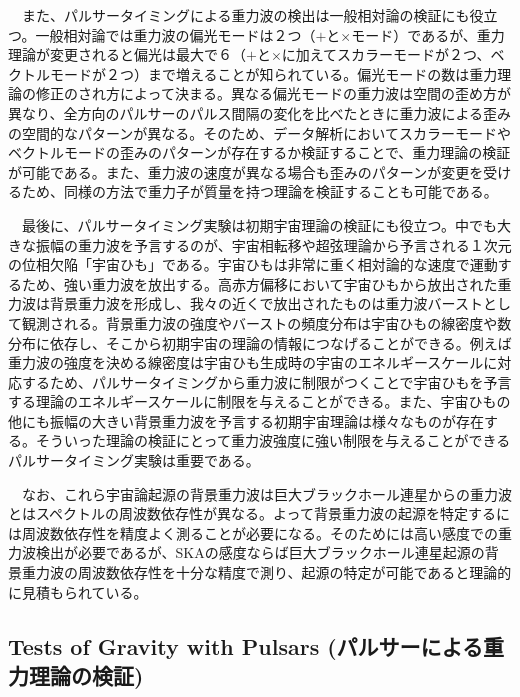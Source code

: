 　また、パルサータイミングによる重力波の検出は一般相対論の検証にも役立つ。一般相対論では重力波の偏光モードは２つ（$+$と$\times$モード）であるが、重力理論が変更されると偏光は最大で６（$+$と$\times$に加えてスカラーモードが２つ、ベクトルモードが２つ）まで増えることが知られている。偏光モードの数は重力理論の修正のされ方によって決まる。異なる偏光モードの重力波は空間の歪め方が異なり、全方向のパルサーのパルス間隔の変化を比べたときに重力波による歪みの空間的なパターンが異なる。そのため、データ解析においてスカラーモードやベクトルモードの歪みのパターンが存在するか検証することで、重力理論の検証が可能である。また、重力波の速度が異なる場合も歪みのパターンが変更を受けるため、同様の方法で重力子が質量を持つ理論を検証することも可能である。

　最後に、パルサータイミング実験は初期宇宙理論の検証にも役立つ。中でも大きな振幅の重力波を予言するのが、宇宙相転移や超弦理論から予言される１次元の位相欠陥「宇宙ひも」である。宇宙ひもは非常に重く相対論的な速度で運動するため、強い重力波を放出する。高赤方偏移において宇宙ひもから放出された重力波は背景重力波を形成し、我々の近くで放出されたものは重力波バーストとして観測される。背景重力波の強度やバーストの頻度分布は宇宙ひもの線密度や数分布に依存し、そこから初期宇宙の理論の情報につなげることができる。例えば重力波の強度を決める線密度は宇宙ひも生成時の宇宙のエネルギースケールに対応するため、パルサータイミングから重力波に制限がつくことで宇宙ひもを予言する理論のエネルギースケールに制限を与えることができる。また、宇宙ひもの他にも振幅の大きい背景重力波を予言する初期宇宙理論は様々なものが存在する。そういった理論の検証にとって重力波強度に強い制限を与えることができるパルサータイミング実験は重要である。

　なお、これら宇宙論起源の背景重力波は巨大ブラックホール連星からの重力波とはスペクトルの周波数依存性が異なる。よって背景重力波の起源を特定するには周波数依存性を精度よく測ることが必要になる。そのためには高い感度での重力波検出が必要であるが、SKAの感度ならば巨大ブラックホール連星起源の背景重力波の周波数依存性を十分な精度で測り、起源の特定が可能であると理論的に見積もられている。




\subsection{Tests of Gravity with Pulsars (パルサーによる重力理論の検証)}

